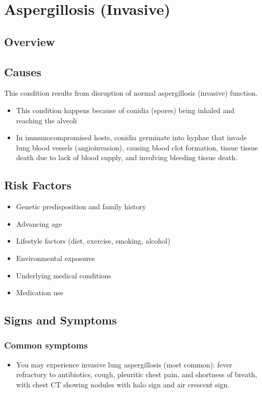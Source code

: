 \chapter{Aspergillosis (Invasive)}
\label{sec:Aspergillosis Invasive}

\section{Overview}

\section{Causes}
This condition results from disruption of normal aspergillosis (invasive) function.

\begin{itemize}[noitemsep]
  \item This condition happens because of conidia (spores) being inhaled and reaching the alveoli
  \item In immunocompromised hosts, conidia germinate into hyphae that invade lung blood vessels (angioinvasion), causing blood clot formation, tissue tissue death due to lack of blood supply, and involving bleeding tissue death.
\end{itemize}
\section{Risk Factors}


\begin{itemize}[noitemsep]
  \item Genetic predisposition and family history
  \item Advancing age
  \item Lifestyle factors (diet, exercise, smoking, alcohol)
  \item Environmental exposures
  \item Underlying medical conditions
  \item Medication use
\end{itemize}
\section{Signs and Symptoms}

\subsection{Common symptoms}
\begin{itemize}[noitemsep]
  \item You may experience invasive lung aspergillosis (most common): fever refractory to antibiotics, cough, pleuritic chest pain, and shortness of breath, with chest CT showing nodules with halo sign and air crescent sign. 
  \end{itemize}

